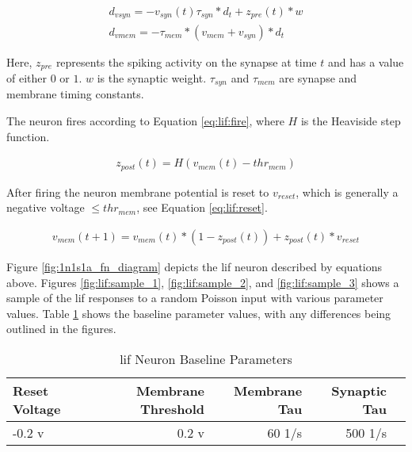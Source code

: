 \begin{align}
d_{vsyn} = -v_{syn}(t) \tau_{syn} * d_t + z_{pre}(t) * w \label{eq:lif:psp} \\
d_{vmem} = -\tau_{mem} * (v_{mem} + v_{syn}) * d_t \label{eq:lif:v}
\end{align}

Here, $z_{pre}$ represents the spiking activity on the synapse at time
$t$ and has a value of either $0$ or $1$. $w$ is the synaptic
weight. $\tau_{syn}$ and $\tau_{mem}$ are synapse and membrane timing
constants.

The neuron fires according to Equation \ref{eq:lif:fire}, where $H$ is the
Heaviside step function.

\begin{align}
z_{post}(t) = H(v_{mem}(t) - thr_{mem}) \label{eq:lif:fire}
\end{align}

After firing the neuron membrane potential is reset to $v_{reset}$, which is
generally a negative voltage $\leq thr_{mem}$, see Equation \ref{eq:lif:reset}.

\begin{align}
v_{mem}(t+1) = v_{mem}(t) * (1 - z_{post}(t)) + z_{post}(t) * v_{reset} \label{eq:lif:reset}
\end{align}

Figure \ref{fig:1n1s1a_fn_diagram} depicts the \Gls{lif} neuron described by
equations above. Figures \ref{fig:lif:sample_1}, \ref{fig:lif:sample_2}, and
\ref{fig:lif:sample_3} shows a sample of the \Gls{lif} responses to a random
Poisson input with various parameter values. Table \ref{table:lif_params} shows
the baseline parameter values, with any differences being outlined in the
figures.

\begin{table}[!htp]\centering
  \caption{\Gls{lif} Neuron Baseline Parameters} \label{table:lif_params}
  \scriptsize
  \begin{tabular}{lrrrr}\toprule
    Reset Voltage &Membrane Threshold &Membrane Tau &Synaptic Tau \\\midrule
    -0.2 v &0.2 v &60 1/s &500 1/s \\
    \bottomrule
  \end{tabular}
\end{table}


